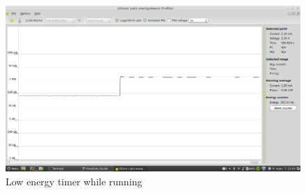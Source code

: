 \begin{figure}[H]
  \centering
  \includegraphics[clip, trim=0cm 0cm 0cm 0cm, width=12cm]{fig/LowEnergyOutput.png}
  \caption{Low energy timer while running}
\end{figure}
